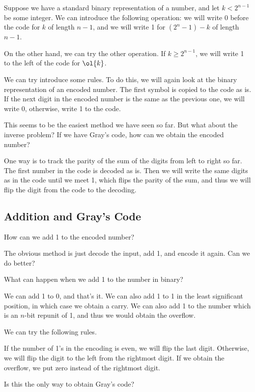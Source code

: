 \documentclass[11pt]{scrartcl}
\begin{document}
  Suppose we have a standard binary representation of a number, and
  let $k < 2^{n-1}$ be some integer. We can introduce the following
  operation: we will write 0 before the code for $k$ of length $n-1$,
  and we will write 1 for $(2^{n}-1)-k$ of length $n-1$.

  On the other hand, we can try the other operation. If
  $k \geq 2^{n-1}$, we will write 1 to the left of the code for
  $\ol{k}$.

  We can try introduce some rules. To do this, we will again look at
  the binary representation of an encoded number. The first symbol is
  copied to the code as is. If the next digit in the encoded number is
  the same as the previous one, we will write 0, otherwise, write 1 to
  the code.

  This seems to be the easiest method we have seen so far. But what
  about the inverse problem? If we have Gray's code, how can we obtain
  the encoded number?

  One way is to track the parity of the sum of the digits from left to
  right so far. The first number in the code is decoded as is. Then we
  will write the same digits as in the code until we meet 1, which
  flips the parity of the sum, and thus we will flip the digit from
  the code to the decoding.

  \subsection{Addition and Gray's Code}

  How can we add 1 to the encoded number?

  The obvious method is just decode the input, add 1, and encode it
  again. Can we do better?

  What can happen when we add 1 to the number in binary?

  We can add 1 to 0, and that's it. We can also add 1 to 1 in the
  least significant position, in which case we obtain a carry. We can
  also add 1 to the number which is an $n$-bit repunit of 1, and thus
  we would obtain the overflow.

  We can try the following rules.

  If the number of 1's in the encoding is even, we will flip the last
  digit. Otherwise, we will flip the digit to the left from the
  rightmost digit. If we obtain the overflow, we put zero instead of
  the rightmost digit.

  Is this the only way to obtain Gray's code?
\end{document}
